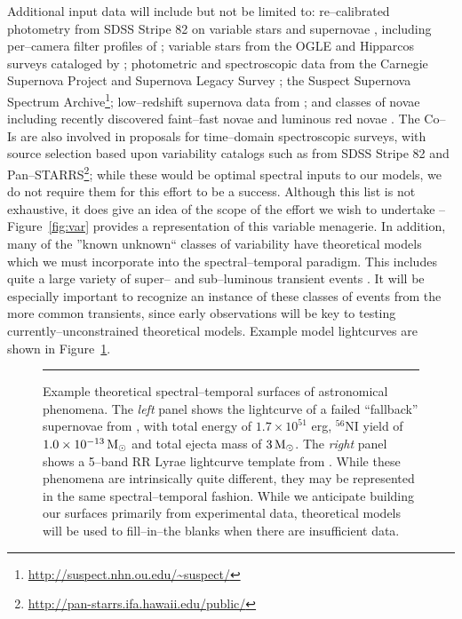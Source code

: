 Additional input data will include but not be limited to: re--calibrated
photometry from SDSS Stripe 82 on variable stars \citep{2010ApJ...708..717S} and
supernovae \citep{2008AJ....136.2306H,2011ApJ...738..162S}, including
per--camera filter profiles of \cite{2007AJ....134..973I}; variable stars from
the OGLE and Hipparcos surveys cataloged by \cite{2007A&A...475.1159D};
photometric and spectroscopic data from the Carnegie Supernova Project
\citep[e.g.][]{2010AJ....139..519C} and Supernova Legacy Survey
\citep[e.g.][]{2011yCat..74101262W}; the Suspect Supernova Spectrum
Archive\footnote{\url{http://suspect.nhn.ou.edu/~suspect/}}; low--redshift
supernova data from \cite{2006AJ....131..527J}; and classes of novae including
recently discovered faint--fast novae \citep{2011ApJ...735...94K} and luminous
red novae \citep{2011ApJ...730..134K}.  The Co--Is are also involved in
proposals for time--domain spectroscopic surveys, with source selection based
upon variability catalogs such as from SDSS Stripe 82 and
Pan--STARRS\footnote{\url{http://pan-starrs.ifa.hawaii.edu/public/}}; while
these would be optimal spectral inputs to our models, we do not require them for
this effort to be a success.  Although this list is not exhaustive, it does give
an idea of the scope of the effort we wish to undertake -- Figure~\ref{fig:var}
provides a representation of this variable menagerie. In addition, many of the
''known unknown`` classes of variability have theoretical models which we must
incorporate into the spectral--temporal paradigm.  This includes quite a large
variety of super-- and sub--luminous transient events
\citep[e.g.][]{2010ApJ...715..767S,2009ApJ...707..193F}.  It will be especially
important to recognize an instance of these classes of events from the more
common transients, since early observations will be key to testing
currently--unconstrained theoretical models.  Example model lightcurves are
shown in Figure~\ref{fig:sts}.

\begin{figure}[t]
\centerline{ \hfil
{}} \smallskip
\caption[]{\footnotesize Example theoretical spectral--temporal surfaces of
astronomical phenomena.  The {\it left} panel shows the lightcurve of a failed
``fallback'' supernovae from \cite{2009ApJ...707..193F}, with total energy of
$1.7 \times 10^{51}$ erg, $^{56}$NI yield of $1.0 \times 10^{-13} {\rm\,M_\odot}$ and
total ejecta mass of $3 {\rm\,M_\odot}$.  The {\it right} panel shows a 5--band RR Lyrae
lightcurve template from \cite{2010ApJ...708..717S}.  While these phenomena are
intrinsically quite different, they may be represented in the same
spectral--temporal fashion.  While we anticipate building our surfaces primarily
from experimental data, theoretical models will be used to fill--in--the blanks
when there are insufficient data.} \medskip \hrule \label{fig:sts} \end{figure}

